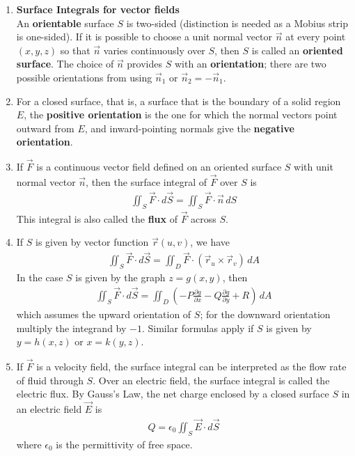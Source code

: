 \documentclass[10pt]{article}
\begin{document}
\begin{multicols*}{2}
\begin{enumerate}
\begin{enumerate}
        \item \textbf{Surface Integrals for vector fields} \\
        An \textbf{orientable} surface $S$ is two-sided (distinction is needed as a Mobius strip is one-sided). If it is possible to choose a unit normal vector $\vec{n}$ at every point $(x,y,z)$ so that $\vec{n}$ varies continuously over $S$, then $S$ is called an \textbf{oriented surface}. The choice of $\vec{n}$ provides $S$ with an \textbf{orientation}; there are two possible orientations from using $\vec{n}_1$ or $\vec{n}_2 = - \vec{n}_1$. 
        \item For a closed surface, that is, a surface that is the boundary of a solid region $E$, the \textbf{positive orientation} is the one for which the normal vectors point outward from $E$, and inward-pointing normals give the \textbf{negative orientation}.
        \item If $\vec{F}$ is a continuous vector field defined on an oriented surface $S$ with unit normal vector $\vec{n}$, then the surface integral of $\vec{F}$ over $S$ is
        \begin{align*}
            \iint_S \vec{F} \cdot d\vec{S} = \iint_S \vec{F} \cdot \vec{n} \,dS
        \end{align*}
        This integral is also called the \textbf{flux} of $\vec{F}$ across $S$.
        \item If $S$ is given by vector function $\vec{r}(u,v)$, we have
        \begin{align*}
            \iint_S \vec{F} \cdot d\vec{S} = \iint_D \vec{F} \cdot (\vec{r}_u \times \vec{r}_v) \,dA
        \end{align*}
        In the case $S$ is given by the graph $z=g(x,y)$, then
        \begin{align*}
            \iint_S \vec{F} \cdot d\vec{S} = \iint_D \left( -P\frac{\partial g}{\partial x} - Q \frac{\partial g}{\partial y} + R \right) \,dA
        \end{align*}
        which assumes the upward orientation of $S$; for the downward orientation multiply the integrand by $-1$. Similar formulas apply if $S$ is given by $y=h(x,z)$ or $x=k(y,z)$.
        \item If $\vec{F}$ is a velocity field, the surface integral can be interpreted as the flow rate of fluid through $S$. Over an electric field, the surface integral is called the electric flux. By Gauss's Law, the net charge enclosed by a closed surface $S$ in an electric field $\vec{E}$ is
        \begin{align*}
            Q = \epsilon_0 \iint_S \vec{E} \cdot d\vec{S}
        \end{align*}
        where $\epsilon_0$ is the permittivity of free space.
    \end{enumerate}
    

\end{enumerate}
\end{multicols*}
\end{document}
